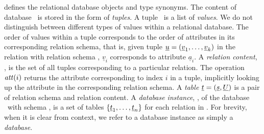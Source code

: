 

 defines the relational database objects and type synonyms.
The content of database \pDB\ is stored in the form of \emph{tuples}. A tuple
\pTuple\ is a list of \emph{values}. We do not distinguish between
different types of values within a relational database.
%
The order of values within a tuple corresponds to the order of attributes in its corresponding
relation schema, that is, given tuple $\pTuple = \paran {\vi {\underline v} k}$
in the relation with relation schema \vRel {},
$\underline{v}_i$ corresponds to attribute $\underline{a}_i$.
%
A \emph{relation content}, \pRelCont, is the set of all tuples  corresponding to a particular relation.
%
The operation $\getAtt {i}$ returns the attribute corresponding to index $i$ in
a tuple, implicitly looking up the attribute in the corresponding relation
schema.
%
A \emph{table} \ensuremath{\pTab = \left(\pRelSch, \pRelCont\right)} is a pair
of relation schema and relation content.
%
A \emph{database instance}, \pInst, of the database \pDB\ with schema \pSch, is
a set of tables $\setDef {\pTab_1, \ldots, \pTab_n}$ for each relation in
\pSch.
For brevity, when it is clear from context, we refer to a database instance as
simply a \emph{database}.




